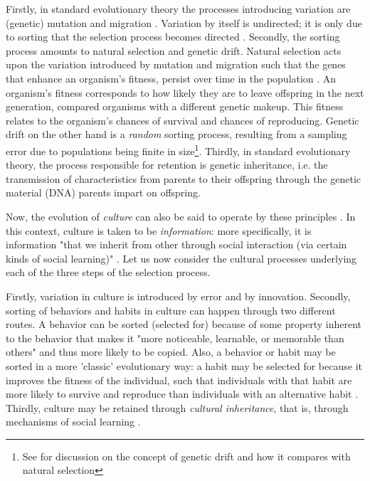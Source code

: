 Firstly, in standard evolutionary theory the processes introducing variation are (genetic) mutation and migration \citep{S-P13}. Variation by itself is undirected; it is only due to sorting that the selection process becomes directed \citep{Donahoe03}.
Secondly, the sorting process amounts to natural selection and genetic drift. Natural selection acts upon the variation introduced by mutation and migration such that the genes that enhance an organism's fitness, persist over time in the population \citep{S-P13}. An organism's fitness corresponds to how likely they are to leave offspring in the next generation, compared organisms with a different genetic makeup. This fitness relates to the organism's chances of survival and chances of reproducing. 
Genetic drift
on the other hand is a \emph{random} sorting process, resulting from a sampling error due to populations being finite in size\footnote{See \citet{Millstein21} for discussion on the concept of genetic drift and how it compares with natural selection}.
Thirdly, in standard evolutionary theory, the process responsible for retention is genetic inheritance, i.e. the transmission of characteristics from parents to their offspring through the genetic material (DNA) parents impart on offspring.

Now, the evolution of \emph{culture} can also be said to operate by these principles \citep{Heyes18}. In this context, culture is taken to be \emph{information}: more specifically, it is information "that we inherit from other through social interaction (via certain kinds of social learning)" \citep[p.~30]{Heyes18}.
Let us now consider the cultural processes underlying each of the three steps of the selection process.

Firstly, variation in culture is introduced by error and by innovation. 
Secondly, sorting of behaviors and habits in culture can happen through two different routes. A behavior can be sorted (selected for) because of some property inherent to the behavior that makes it "more noticeable, learnable, or memorable than others" \citep[p.~34]{Heyes18}  and thus more likely to be copied. Also, a behavior or habit may be sorted in a more 'classic' evolutionary way: a habit may be selected for because it improves the fitness of the individual, such that individuals with that habit are more likely to survive and reproduce than individuals with an alternative habit .
Thirdly, culture may be retained through \emph{cultural inheritance}, that is, through mechanisms of social learning .

